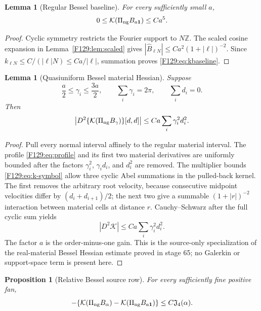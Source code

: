 \documentclass[11pt]{amsart}
\numberwithin{equation}{section}
\newtheorem{proposition}[theorem]{Proposition}
\newtheorem{lemma}[theorem]{Lemma}
\theoremstyle{definition}
\theoremstyle{remark}
\newcommand{\PiNG}{\Pi_{\rm ng}}
\newcommand{\Jfour}{\mathfrak J_4}
\newcommand{\kform}{\mathcal K}
\begin{document}
\begin{lemma}[Regular Bessel baseline]\label{F129:lem:kbaseline}
For every sufficiently small \(a\),
\begin{equation}\label{F129:eq:kbaseline}
 0\le\kform(\PiNG B_{a\mathbf1})\le Ca^5.
\end{equation}
\end{lemma}

\begin{proof}
Cyclic symmetry restricts the Fourier support to \(N\mathbb Z\).
The scaled cosine expansion in Lemma~\ref{F129:lem:scaled} gives
\(|\widehat B_{\ell N}|\le Ca^2(1+|\ell|)^{-2}\).  Since
\(k_{\ell N}\le C/(|\ell|N)\le Ca/|\ell|\), summation proves
\eqref{F129:eq:kbaseline}.
\end{proof}

\begin{lemma}[Quasiuniform Bessel material Hessian]\label{F129:lem:kHessian}
Suppose
\begin{equation}
 \frac a2\le\gamma_i\le\frac{3a}{2},\qquad
 \sum_i\gamma_i=2\pi,\qquad \sum_i d_i=0.
\end{equation}
Then
\begin{equation}\label{F129:eq:kHessian}
 \left|D^2\{\kform(\PiNG B_\gamma)\}[d,d]\right|
 \le Ca\sum_i\gamma_i^2d_i^2.
\end{equation}
\end{lemma}

\begin{proof}
Pull every normal interval affinely to the regular material interval.
The profile \eqref{F129:eq:profile} and its first two material derivatives are
uniformly bounded after the factors \(\gamma_i^2\), \(\gamma_id_i\), and
\(d_i^2\) are removed.  The multiplier bounds \eqref{F129:eq:k-symbol} allow
three cyclic Abel summations in the pulled-back kernel.  The first removes
the arbitrary root velocity, because consecutive midpoint velocities
differ by \((d_i+d_{i+1})/2\); the next two give a summable
\((1+|r|)^{-2}\) interaction between material cells at distance \(r\).
Cauchy--Schwarz after the full cyclic sum yields
\begin{equation}
 |D^2\kform|
 \le Ca\sum_i\gamma_i^2d_i^2.
\end{equation}
The factor \(a\) is the order-minus-one gain.  This is the source-only
specialization of the real-material Bessel Hessian estimate proved in
stage 65; no Galerkin or support-space term is present here.
\end{proof}

\begin{proposition}[Relative Bessel source row]\label{F129:prop:krelative}
For every sufficiently fine positive fan,
\begin{equation}\label{F129:eq:krelative}
 -\{\kform(\PiNG B_\alpha)-\kform(\PiNG B_{a\mathbf1})\}
 \le C\Jfour(\alpha).
\end{equation}
\end{proposition}
\end{document}
